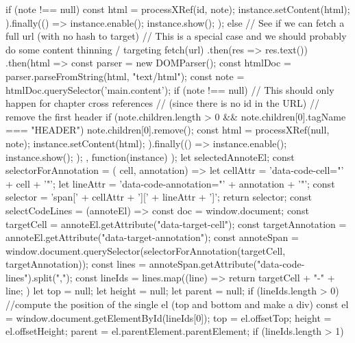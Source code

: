 {{{{{{              if (note !== null) {
                const html = processXRef(id, note);
                instance.setContent(html);
              } 
            }).finally(() => {
              instance.enable();
              instance.show();
            });
          }
        } else {
          // See if we can fetch a full url (with no hash to target)
          // This is a special case and we should probably do some content thinning / targeting
          fetch(url)
          .then(res => res.text())
          .then(html => {
            const parser = new DOMParser();
            const htmlDoc = parser.parseFromString(html, "text/html");
            const note = htmlDoc.querySelector('main.content');
            if (note !== null) {
              // This should only happen for chapter cross references
              // (since there is no id in the URL)
              // remove the first header
              if (note.children.length > 0 && note.children[0].tagName === "HEADER") {
                note.children[0].remove();
              }
              const html = processXRef(null, note);
              instance.setContent(html);
            } 
          }).finally(() => {
            instance.enable();
            instance.show();
          });
        }
      }, function(instance) {
      });
    }
        let selectedAnnoteEl;
        const selectorForAnnotation = ( cell, annotation) => {
          let cellAttr = 'data-code-cell="' + cell + '"';
          let lineAttr = 'data-code-annotation="' +  annotation + '"';
          const selector = 'span[' + cellAttr + '][' + lineAttr + ']';
          return selector;
        }
        const selectCodeLines = (annoteEl) => {
          const doc = window.document;
          const targetCell = annoteEl.getAttribute("data-target-cell");
          const targetAnnotation = annoteEl.getAttribute("data-target-annotation");
          const annoteSpan = window.document.querySelector(selectorForAnnotation(targetCell, targetAnnotation));
          const lines = annoteSpan.getAttribute("data-code-lines").split(",");
          const lineIds = lines.map((line) => {
            return targetCell + "-" + line;
          })
          let top = null;
          let height = null;
          let parent = null;
          if (lineIds.length > 0) {
              //compute the position of the single el (top and bottom and make a div)
              const el = window.document.getElementById(lineIds[0]);
              top = el.offsetTop;
              height = el.offsetHeight;
              parent = el.parentElement.parentElement;
            if (lineIds.length > 1) {
}}}}
